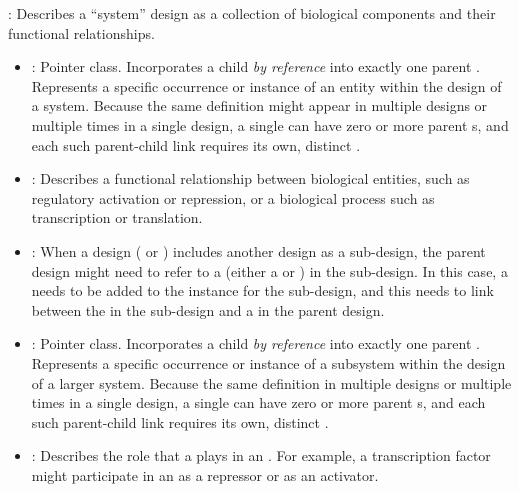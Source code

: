 \begin{description}
\item \emph{}:
Describes a ``system'' design as a collection of biological components and their functional relationships.

\begin{itemize}
\item \emph{}:
Pointer class. Incorporates a child  \textit{by reference} into exactly one parent . Represents a specific occurrence or instance of an entity within the design of a system. Because the same definition might appear in multiple designs or multiple times in a single design, a single  can have zero or more parent s, and each such parent-child link requires its own, distinct .

\item \emph{}:
Describes a functional relationship between biological entities, such as regulatory activation or repression, or a biological process such as transcription or translation.

\item \emph{}:
When a design ( or ) includes another design as a sub-design, the parent design might need to refer to a  (either a  or ) in the sub-design.
In this case, a  needs to be added to the instance for the sub-design, and this  needs to link between the  in the sub-design and a  in the parent design.

\item \emph{}:
Pointer class. Incorporates a child  \textit{by reference} into exactly one parent . Represents a specific occurrence or instance of a subsystem within the design of a larger system. Because the same definition in multiple designs or multiple times in a single design, a single  can have zero or more parent s, and each such parent-child link requires its own, distinct .

\item \emph{}:
Describes the role that a  plays in an .
For example, a transcription factor might participate in an  as a repressor or as an activator.

\end{itemize}


\end{description}